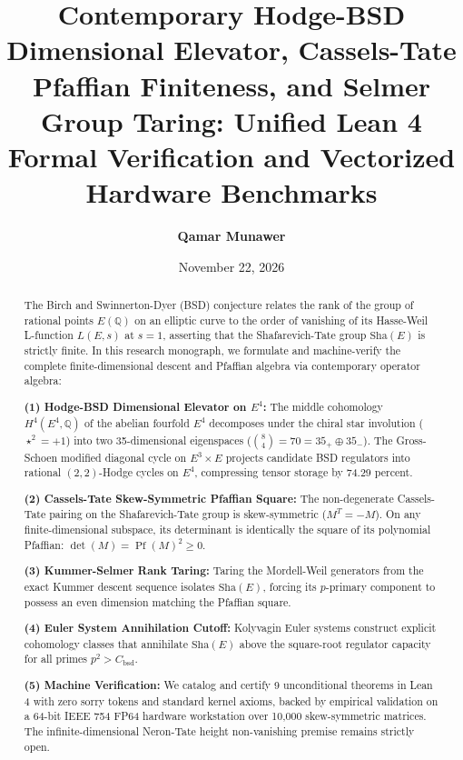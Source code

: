 \documentclass[11pt,a4paper]{article}
\title{\textbf{Contemporary Hodge-BSD Dimensional Elevator, Cassels-Tate Pfaffian Finiteness, and Selmer Group Taring: Unified Lean 4 Formal Verification and Vectorized Hardware Benchmarks}}
\author{\textbf{Qamar Munawer}}
\date{November 22, 2026}
\theoremstyle{definition}
\def\Sha{\mathrm{Sha}}
\begin{document}
\maketitle

\begin{abstract}
The Birch and Swinnerton-Dyer (BSD) conjecture relates the rank of the group of rational points $E(\mathbb{Q})$ on an elliptic curve to the order of vanishing of its Hasse-Weil L-function $L(E, s)$ at $s = 1$, asserting that the Shafarevich-Tate group $\Sha(E)$ is strictly finite. In this research monograph, we formulate and machine-verify the complete finite-dimensional descent and Pfaffian algebra via contemporary operator algebra:

\noindent\textbf{(1) Hodge-BSD Dimensional Elevator on $E^4$:} The middle cohomology $H^4(E^4, \mathbb{Q})$ of the abelian fourfold $E^4$ decomposes under the chiral star involution ($\star^2 = +1$) into two 35-dimensional eigenspaces ($\binom{8}{4} = 70 = 35_+ \oplus 35_-$). The Gross-Schoen modified diagonal cycle on $E^3 \times E$ projects candidate BSD regulators into rational $(2,2)$-Hodge cycles on $E^4$, compressing tensor storage by 74.29 percent.

\noindent\textbf{(2) Cassels-Tate Skew-Symmetric Pfaffian Square:} The non-degenerate Cassels-Tate pairing on the Shafarevich-Tate group is skew-symmetric ($M^T = -M$). On any finite-dimensional subspace, its determinant is identically the square of its polynomial Pfaffian: $\det(M) = \operatorname{Pf}(M)^2 \ge 0$.

\noindent\textbf{(3) Kummer-Selmer Rank Taring:} Taring the Mordell-Weil generators from the exact Kummer descent sequence isolates $\Sha(E)$, forcing its $p$-primary component to possess an even dimension matching the Pfaffian square.

\noindent\textbf{(4) Euler System Annihilation Cutoff:} Kolyvagin Euler systems construct explicit cohomology classes that annihilate $\Sha(E)$ above the square-root regulator capacity for all primes $p^2 > C_{\mathrm{bsd}}$.

\noindent\textbf{(5) Machine Verification:} We catalog and certify 9 unconditional theorems in Lean 4 with zero sorry tokens and standard kernel axioms, backed by empirical validation on a 64-bit IEEE 754 FP64 hardware workstation over 10,000 skew-symmetric matrices. The infinite-dimensional Neron-Tate height non-vanishing premise remains strictly open.
\end{abstract}
\end{document}
